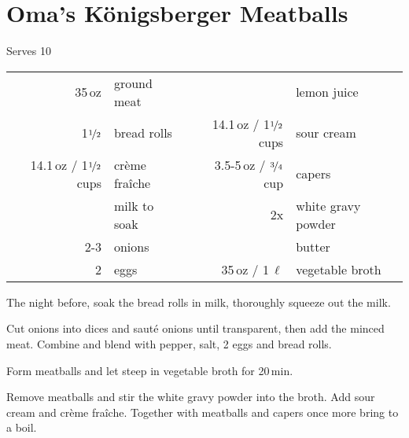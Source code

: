 \section{Oma's K\"{o}nigsberger Meatballs}
\begin{centering}
Serves 10
\begin{table}[H]
\centering
\begin{tabular*}{1\textwidth}{rlrl}
35\,oz & ground meat & & lemon juice \\
1$\nicefrac{1}{2}$ & bread rolls & 14.1\,oz / 1$\nicefrac{1}{2}$ cups & sour cream \\
14.1\,oz / 1$\nicefrac{1}{2}$ cups & cr\`{e}me fra\^{i}che &3.5-5\,oz / $\nicefrac{3}{4}$ cup & capers \\
&milk to soak &2x &white gravy powder\\
2-3 & onions & &butter\\
2 & eggs & 35\,oz / 1\,$\ell$ & vegetable broth\\
\end{tabular*}
\end{table}
\end{centering}
\begin{Notes}
\item The night before, soak the bread rolls in milk, thoroughly squeeze out the milk.
\item Cut onions into dices and saut\'{e} onions until transparent, then add the minced meat. Combine and blend with pepper, salt, 2 eggs and bread rolls. 
\item Form meatballs and let steep in vegetable broth for 20\,min.
\item Remove meatballs and stir the white gravy powder into the broth. Add sour cream and cr\`{e}me fra\^{i}che. Together with meatballs and capers once more bring to a boil.
\end{Notes}

